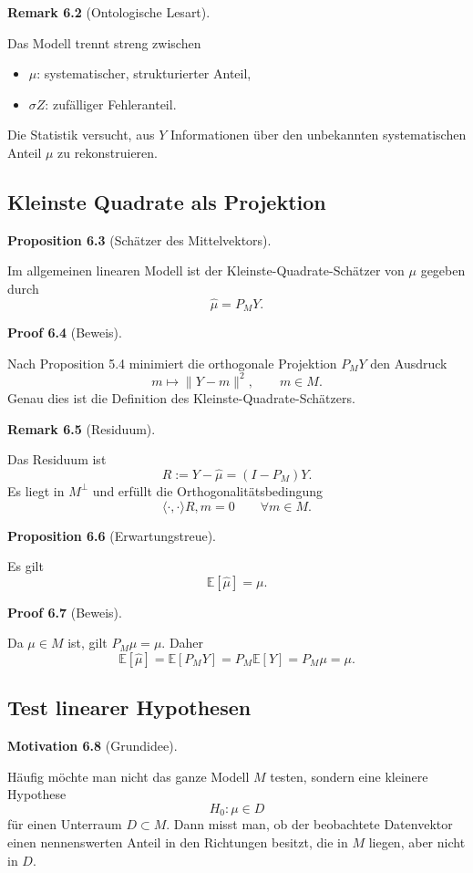 \documentclass[10pt, letterpaper]{article}
\newcommand{\SKP}{\langle\cdot,\cdot\rangle}
\newcommand{\CustomHeading}[3]{%
  \par\medskip\noindent%
  \textbf{#1 #2} \textnormal{(#3)}.\enskip%
}
\newenvironment{PROP}[2]{\CustomHeading{Proposition}{#1}{#2}}{}
\newenvironment{REM}[2]{\CustomHeading{Remark}{#1}{#2}}{}
\newenvironment{MOT}[2]{\CustomHeading{Motivation}{#1}{#2}}{}
\newenvironment{PROOF}[2]{\CustomHeading{Proof}{#1}{#2}}{}
\begin{document}
\begin{REM}{6.2}{Ontologische Lesart}
Das Modell trennt streng zwischen
\begin{itemize}
    \item \(\mu\): systematischer, strukturierter Anteil,
    \item \(\sigma Z\): zufälliger Fehleranteil.
\end{itemize}
Die Statistik versucht, aus \(Y\) Informationen über den unbekannten systematischen Anteil \(\mu\) zu rekonstruieren.
\end{REM}

\subsection{Kleinste Quadrate als Projektion}

\begin{PROP}{6.3}{Schätzer des Mittelvektors}
Im allgemeinen linearen Modell ist der Kleinste-Quadrate-Schätzer von \(\mu\) gegeben durch
\[
\hat\mu=P_M Y.
\]
\end{PROP}

\begin{PROOF}{6.4}{Beweis}
Nach Proposition 5.4 minimiert die orthogonale Projektion \(P_M Y\) den Ausdruck
\[
m\mapsto \|Y-m\|^2,\qquad m\in M.
\]
Genau dies ist die Definition des Kleinste-Quadrate-Schätzers.
\end{PROOF}

\begin{REM}{6.5}{Residuum}
Das Residuum ist
\[
R:=Y-\hat\mu=(I-P_M)Y.
\]
Es liegt in \(M^\perp\) und erfüllt die Orthogonalitätsbedingung
\[
\SKP{R,m}=0\qquad \forall m\in M.
\]
\end{REM}

\begin{PROP}{6.6}{Erwartungstreue}
Es gilt
\[
\mathbb E[\hat\mu]=\mu.
\]
\end{PROP}

\begin{PROOF}{6.7}{Beweis}
Da \(\mu\in M\) ist, gilt \(P_M\mu=\mu\). Daher
\[
\mathbb E[\hat\mu]
=
\mathbb E[P_MY]
=
P_M\mathbb E[Y]
=
P_M\mu
=
\mu.
\]
\end{PROOF}

\subsection{Test linearer Hypothesen}

\begin{MOT}{6.8}{Grundidee}
Häufig möchte man nicht das ganze Modell \(M\) testen, sondern eine kleinere Hypothese
\[
H_0:\mu\in D
\]
für einen Unterraum \(D\subset M\). Dann misst man, ob der beobachtete Datenvektor einen nennenswerten Anteil in den Richtungen besitzt, die in \(M\) liegen, aber nicht in \(D\).
\end{MOT}
\end{document}

